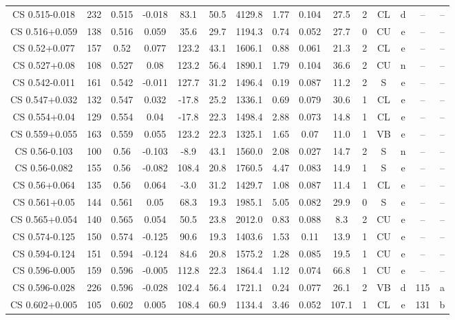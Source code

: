 \begin{table}
\begin{tabular}{ccccccccccccccc}
CS 0.515-0.018 & 232 & 0.515 & -0.018 & 83.1 & 50.5 & 4129.8 & 1.77 & 0.104 & 27.5 & 2 & CL & d & -- & -- \\
CS 0.516+0.059 & 138 & 0.516 & 0.059 & 35.6 & 29.7 & 1194.3 & 0.74 & 0.052 & 27.7 & 0 & CU & e & -- & -- \\
CS 0.52+0.077 & 157 & 0.52 & 0.077 & 123.2 & 43.1 & 1606.1 & 0.88 & 0.061 & 21.3 & 2 & CL & e & -- & -- \\
CS 0.527+0.08 & 108 & 0.527 & 0.08 & 123.2 & 56.4 & 1890.1 & 1.79 & 0.104 & 36.6 & 2 & CU & n & -- & -- \\
CS 0.542-0.011 & 161 & 0.542 & -0.011 & 127.7 & 31.2 & 1496.4 & 0.19 & 0.087 & 11.2 & 2 & S & e & -- & -- \\
CS 0.547+0.032 & 132 & 0.547 & 0.032 & -17.8 & 25.2 & 1336.1 & 0.69 & 0.079 & 30.6 & 1 & CL & e & -- & -- \\
CS 0.554+0.04 & 129 & 0.554 & 0.04 & -17.8 & 22.3 & 1498.4 & 2.88 & 0.073 & 14.8 & 1 & CL & e & -- & -- \\
CS 0.559+0.055 & 163 & 0.559 & 0.055 & 123.2 & 22.3 & 1325.1 & 1.65 & 0.07 & 11.0 & 1 & VB & e & -- & -- \\
CS 0.56-0.103 & 100 & 0.56 & -0.103 & -8.9 & 43.1 & 1560.0 & 2.08 & 0.027 & 14.7 & 2 & S & n & -- & -- \\
CS 0.56-0.082 & 155 & 0.56 & -0.082 & 108.4 & 20.8 & 1760.5 & 4.47 & 0.083 & 14.9 & 1 & S & e & -- & -- \\
CS 0.56+0.064 & 135 & 0.56 & 0.064 & -3.0 & 31.2 & 1429.7 & 1.08 & 0.087 & 11.4 & 1 & CL & e & -- & -- \\
CS 0.561+0.05 & 144 & 0.561 & 0.05 & 68.3 & 19.3 & 1985.1 & 5.05 & 0.082 & 29.9 & 0 & S & e & -- & -- \\
CS 0.565+0.054 & 140 & 0.565 & 0.054 & 50.5 & 23.8 & 2012.0 & 0.83 & 0.088 & 8.3 & 2 & CU & e & -- & -- \\
CS 0.574-0.125 & 150 & 0.574 & -0.125 & 90.6 & 19.3 & 1403.6 & 1.53 & 0.11 & 13.9 & 1 & CU & e & -- & -- \\
CS 0.594-0.124 & 151 & 0.594 & -0.124 & 84.6 & 20.8 & 1575.2 & 1.28 & 0.085 & 19.5 & 1 & CU & e & -- & -- \\
CS 0.596-0.005 & 159 & 0.596 & -0.005 & 112.8 & 22.3 & 1864.4 & 1.12 & 0.074 & 66.8 & 1 & CU & e & -- & -- \\
CS 0.596-0.028 & 226 & 0.596 & -0.028 & 102.4 & 56.4 & 1721.1 & 0.24 & 0.077 & 26.1 & 2 & VB & d & 115 & a \\
CS 0.602+0.005 & 105 & 0.602 & 0.005 & 108.4 & 60.9 & 1134.4 & 3.46 & 0.052 & 107.1 & 1 & CL & e & 131 & b \\

\end{tabular}
\end{table}
